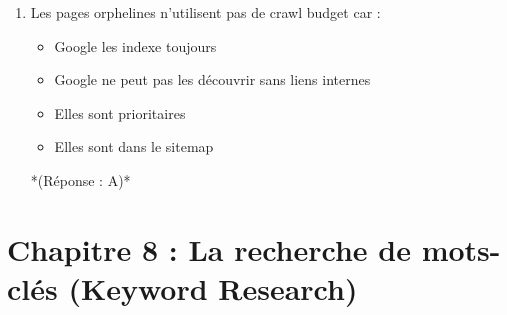 \documentclass[12pt,a4paper,twoside]{report}
\begin{document}
\begin{enumerate}
\item Les pages orphelines n'utilisent pas de crawl budget car :
\begin{itemize}
\item[A)] Google les indexe toujours
\item[B)] Google ne peut pas les découvrir sans liens internes
\item[C)] Elles sont prioritaires
\item[D)] Elles sont dans le sitemap
\end{itemize}
*(Réponse : A)*
\end{enumerate}

\newpage

\section*{Chapitre 8 : La recherche de mots-clés (Keyword Research)}
\end{document}
